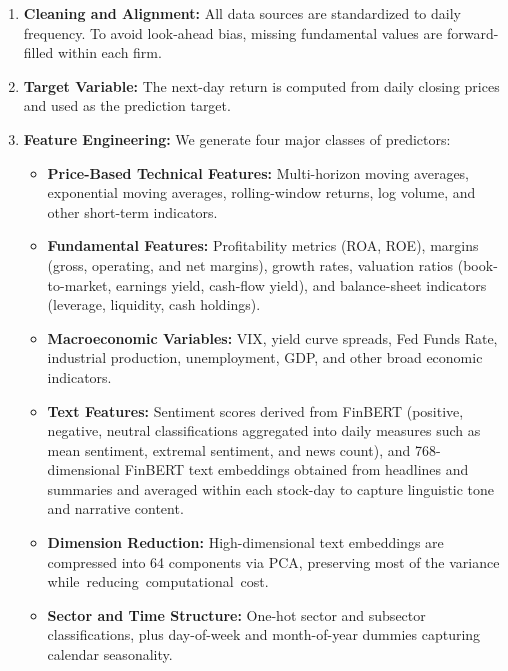 \documentclass[11pt]{article}
\begin{document}
\begin{enumerate}
    \item \textbf{Cleaning and Alignment:}  
    All data sources are standardized to daily frequency. To avoid look-ahead bias, missing fundamental values are forward-filled within each firm.

    \item \textbf{Target Variable:}  
    The next-day return is computed from daily closing prices and used as the prediction target.

    \item \textbf{Feature Engineering:}  
    We generate four major classes of predictors:
    \begin{itemize}
        \item \textbf{Price-Based Technical Features:} 
        Multi-horizon moving averages, exponential moving averages, rolling-window returns, log volume, and other short-term indicators.
        
        \item \textbf{Fundamental Features:} 
        Profitability metrics (ROA, ROE), margins (gross, operating, and net margins), growth rates, valuation ratios (book-to-market, earnings yield, cash-flow yield), and balance-sheet indicators (leverage, liquidity, cash holdings).
        
        \item \textbf{Macroeconomic Variables:} 
        VIX, yield curve spreads, Fed Funds Rate, industrial production, unemployment, GDP, and other broad economic indicators.
        
        \item \textbf{Text Features:}
        Sentiment scores derived from FinBERT (positive, negative, neutral classifications aggregated into daily measures such as mean sentiment, extremal sentiment, and news count), and 768-dimensional FinBERT text embeddings obtained from headlines and summaries and averaged within each stock-day to capture linguistic tone and narrative content.
        
        \item \textbf{Dimension Reduction:}
        High-dimensional text embeddings are compressed into 64 components via PCA, preserving most of the variance while~reducing~computational~cost.

        \item \textbf{Sector and Time Structure:}
        One-hot sector and subsector classifications, plus day-of-week and month-of-year dummies capturing calendar seasonality.
    \end{itemize}



\end{enumerate}
\end{document}
